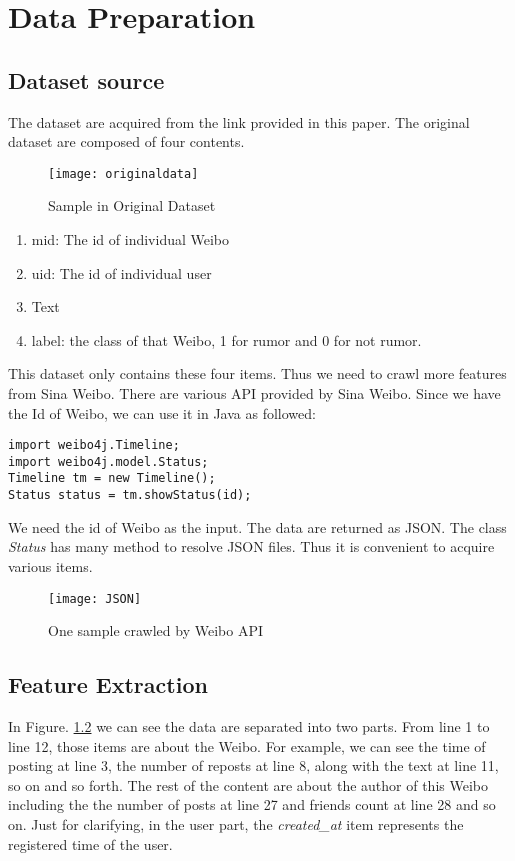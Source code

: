 \iffalse

\fi

\chapter{Data Preparation}
\section{Dataset source}
The dataset are acquired from the link provided in this paper\cite{wu2015false}. The original dataset are composed of four contents. 
\begin{figure}[h]\centering 
\texttt{[image: originaldata]}
\caption{Sample in Original Dataset}\label{fig:originaldataset} \end{figure}

\begin{enumerate} \item mid: The id of individual Weibo \item uid: The id of individual user \item Text \item label: the class of that Weibo, 1 for rumor and 0 for not rumor.
\end{enumerate}

This dataset only contains these four items. Thus we need to crawl more features from Sina Weibo. There are various API provided by Sina Weibo. Since we have the Id of Weibo, we can use it in Java as followed:
\clearpage
\begin{lstlisting}[language=inform]
import weibo4j.Timeline;
import weibo4j.model.Status;
Timeline tm = new Timeline();
Status status = tm.showStatus(id);
\end{lstlisting}
We need the id of Weibo as the input. The data are returned as JSON. The class \textit{Status} has many method to resolve JSON files. Thus it is convenient to acquire various items.
\begin{figure}[h]\centering 
\texttt{[image: JSON]}
\caption{One sample crawled by Weibo API} \label{fig:JSON} 
\end{figure}

\section{Feature Extraction}
In Figure. \ref{fig:JSON} we can see the data are separated into two parts. From line 1 to line 12, those items are about the Weibo. For example, we can see the time of posting at line 3, the number of reposts at line 8, along with the text at line 11, so on and so forth. The rest of the content are about the author of this Weibo including the the number of posts at line 27 and friends count at line 28 and so on. Just for clarifying, in the user part, the \textit{created\_at} item represents the registered time of the user.

